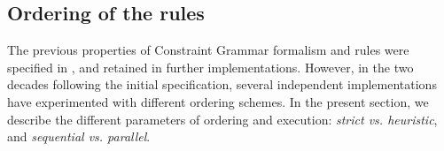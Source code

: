 


\subsection{Ordering of the rules}\label{ordering}

The previous properties of Constraint Grammar formalism and rules were specified in \cite{karlsson1995constraint}, and retained in further implementations. 
However, in the two decades following the initial specification, 
several independent implementations have experimented with different ordering
schemes. In the present section, we describe the different parameters of ordering and execution: \emph{strict vs. heuristic}, and \emph{sequential vs. parallel}.



